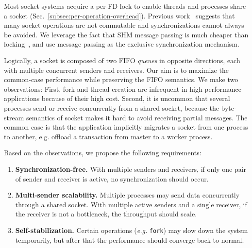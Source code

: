 Most socket systems acquire a per-FD lock to enable threads and processes share a socket (Sec.~\ref{subsec:per-operation-overhead}).
Previous work~\cite{boyd2010analysis,clements2015scalable} suggests that many socket operations are not commutable and synchronizations cannot always be avoided.
We leverage the fact that SHM message passing is much cheaper than locking~\cite{roghanchi2017ffwd}, and use message passing as the exclusive synchronization mechanism.

Logically, a socket is composed of two FIFO \emph{queues} in opposite directions, each with multiple concurrent senders and receivers.
Our aim is to maximize the common-case performance while preserving the FIFO semantics.
We make two observations: First, fork and thread creation are infrequent in high performance applications because of their high cost.
Second, it is uncommon that several processes send or receive concurrently from a shared socket, because the byte-stream semantics of socket makes it hard to avoid receiving partial messages.
The common case is that the application implicitly migrates a socket from one process to another, e.g. offload a transaction from master to a worker process.

\iffalse
Based on the observations, we propose the following requirements:

\begin{enumerate}
 \item \textbf{Synchronization-free.} With multiple senders and receivers, if only one pair of sender and receiver is active, no synchronization should occur.
 \item \textbf{Multi-sender scalability.} Multiple processes may send data concurrently through a shared socket. With multiple active senders and a single receiver, if the receiver is not a bottleneck, the throughput should scale.
 \item \textbf{Self-stabilization.} Certain operations (\textit{e.g.} \texttt{fork}) may slow down the system temporarily, but after that the performance should converge back to normal.
\end{enumerate}

